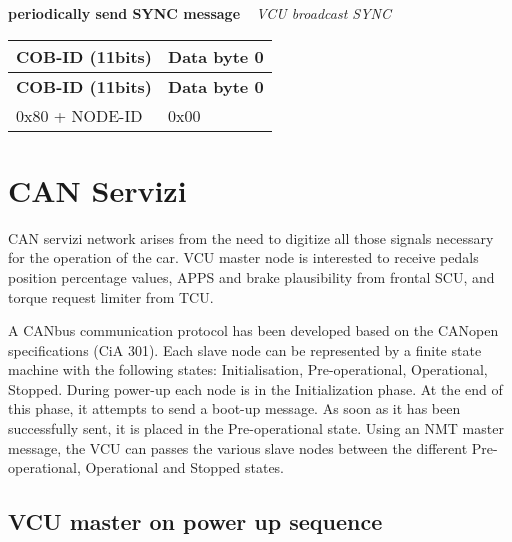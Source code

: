 \begin{DoxyEnumerate}
\item {\bfseries periodically send S\+Y\+NC message} ~\newline
 {\itshape V\+CU broadcast S\+Y\+NC} \tabulinesep=1mm
\begin{longtabu} spread 0pt [c]{*{2}{|X[-1]}|}
\hline
\rowcolor{\tableheadbgcolor}\textbf{ C\+O\+B-\/\+ID (11bits)  }&\textbf{ Data byte 0   }\\
\endfirsthead
\hline
\endfoot
\hline
\rowcolor{\tableheadbgcolor}\textbf{ C\+O\+B-\/\+ID (11bits)  }&\textbf{ Data byte 0   }\\
\endhead
0x80 + N\+O\+D\+E-\/\+ID  &0x00   \\
\end{longtabu}

\end{DoxyEnumerate}\hypertarget{CAN_servizi_page}{}\section{C\+AN Servizi}\label{CAN_servizi_page}
C\+AN servizi network arises from the need to digitize all those signals necessary for the operation of the car. V\+CU master node is interested to receive pedals position percentage values, A\+P\+PS and brake plausibility from frontal S\+CU, and torque request limiter from T\+CU.

A C\+A\+Nbus communication protocol has been developed based on the C\+A\+Nopen specifications (CiA 301). Each slave node can be represented by a finite state machine with the following states\+: Initialisation, Pre-\/operational, Operational, Stopped. During power-\/up each node is in the Initialization phase. At the end of this phase, it attempts to send a boot-\/up message. As soon as it has been successfully sent, it is placed in the Pre-\/operational state. Using an N\+MT master message, the V\+CU can passes the various slave nodes between the different Pre-\/operational, Operational and Stopped states.

\subsection*{V\+CU master on power up sequence}



